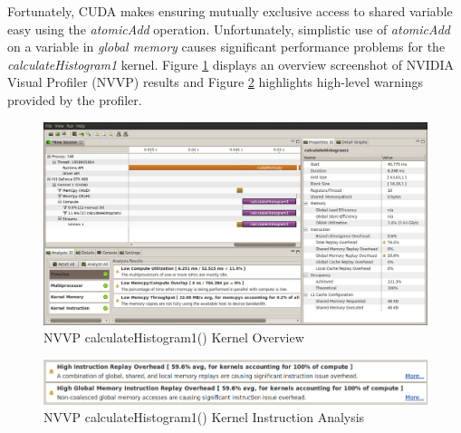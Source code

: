 \documentclass{article}
\begin{document}
Fortunately, CUDA makes ensuring mutually exclusive access to shared variable easy using the \emph{atomicAdd} operation\cite{arithmetic-functions}. Unfortunately, simplistic use of \emph{atomicAdd} on a variable in \emph{global memory} causes significant performance problems for the \emph{calculateHistogram1} kernel. Figure \ref{kernel1nvvp1} displays an overview screenshot of NVIDIA Visual Profiler (NVVP) results and Figure \ref{kernel1nvvp2} highlights high-level warnings provided by the profiler.

\begin{figure}
\centering
\includegraphics[width=1.0\textwidth]{screenshots/nvvp/calculateHistogram1_screen1.png}
\caption{NVVP calculateHistogram1() Kernel Overview }
\label{kernel1nvvp1}
\end{figure}

\begin{figure}
\centering
\includegraphics[width=1.0\textwidth]{screenshots/nvvp/calculateHistogram1_screen2.png}
\caption{NVVP calculateHistogram1() Kernel Instruction Analysis}
\label{kernel1nvvp2}
\end{figure}
\end{document}
